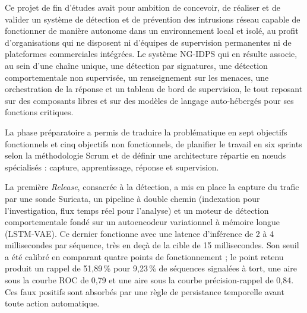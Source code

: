 \label{chap:conclusion}

Ce projet de fin d'études avait pour ambition de concevoir, de réaliser et de valider un système de détection et de prévention des intrusions réseau capable de fonctionner de manière autonome dans un environnement local et isolé, au profit d'organisations qui ne disposent ni d'équipes de supervision permanentes ni de plateformes commerciales intégrées. Le système NG-IDPS qui en résulte associe, au sein d'une chaîne unique, une détection par signatures, une détection comportementale non supervisée, un renseignement sur les menaces, une orchestration de la réponse et un tableau de bord de supervision, le tout reposant sur des composants libres et sur des modèles de langage auto-hébergés pour ses fonctions critiques.

La phase préparatoire a permis de traduire la problématique en sept objectifs fonctionnels et cinq objectifs non fonctionnels, de planifier le travail en six sprints selon la méthodologie Scrum et de définir une architecture répartie en nœuds spécialisés : capture, apprentissage, réponse et supervision.

La première \textit{Release}, consacrée à la détection, a mis en place la capture du trafic par une sonde Suricata, un pipeline à double chemin (indexation pour l'investigation, flux temps réel pour l'analyse) et un moteur de détection comportementale fondé sur un autoencodeur variationnel à mémoire longue (LSTM-VAE). Ce dernier fonctionne avec une latence d'inférence de 2 à 4 millisecondes par séquence, très en deçà de la cible de 15 millisecondes. Son seuil a été calibré en comparant quatre points de fonctionnement ; le point retenu produit un rappel de 51,89\,\% pour 9,23\,\% de séquences signalées à tort, une aire sous la courbe ROC de 0,79 et une aire sous la courbe précision-rappel de 0,84. Ces faux positifs sont absorbés par une règle de persistance temporelle avant toute action automatique.

